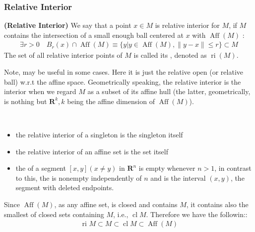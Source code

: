 \documentclass{article}
\newcommand{\bfs}[1]{\textbf{({#1}) }}
\newcommand{\ri}{\operatorname{ri}}
\newcommand{\Aff}{\operatorname{Aff}}
\begin{document}
\subsubsection{Relative Interior} 
\begin{defa}{\bfs{Relative Interior}}
 We say that a point $x \in M$ is relative interior for $M$, if $M$ contains the intersection of a small enough ball centered at $x$ with $\Aff(M)$ :
\begin{align*}
\exists r>0 \quad B_{r}(x) \cap \operatorname{Aff}(M) \equiv\{y|y \in \operatorname{Aff}(M),\| y-x \| \leq r\} \subset M
\end{align*}
The set of all relative interior points of $M$ is called its , denoted as $\ri(M)$.
\end{defa} 
\begin{rema}
Note, \cite[Theorem 2.30]{rudin1976principles} may be useful in some cases. Here it is just the relative open (or relative ball) w.r.t the affine space. 
\tb{$$\ri(M)\text{ is relative open w.r.t. } \Aff(M)$$}
Geometrically speaking, the relative interior is the interior when we regard $M$ as a subset of its affine hull (the latter, geometrically, is nothing but $\mathbf{R}^{k}, k$ being the affine dimension of $\Aff(M)$). 
\end{rema}
\begin{exma}$\quad$
\vspace{-0.2cm}
 \begin{itemize}
     \item the relative interior of a singleton is the singleton itself
     \item the relative interior of an affine set is the set itself
     \item the  of a segment $[x, y](x \neq y)$ in $\mathbf{R}^{n}$ is empty whenever $n>1$, in contrast to this, the  is nonempty independently of $n$ and is the interval $(x, y)$, the segment with deleted endpoints. 
 \end{itemize}
\end{exma} 
Since  $\Aff(M)$, as any affine set, is closed and contains $M$, it contains also the smallest of closed sets containing $M$, i.e., $\operatorname{cl} M$. Therefore we have the followin::
\begin{align*}
\text { ri } M \subset M \subset \operatorname{cl} M \subset \operatorname{Aff}(M)
\end{align*}
\end{document}
